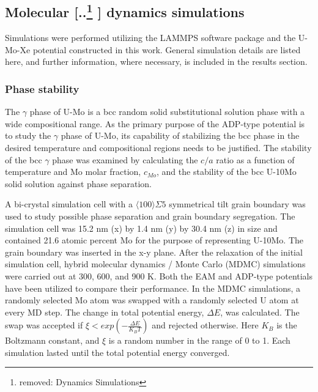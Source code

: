 \documentclass[review]{elsarticle}
\providecommand{\DIFaddtex}[1]{{\protect\color{blue} \sf #1}} %
\providecommand{\DIFdeltex}[1]{{\protect\color{red} [..\footnote{removed: #1} ]}} %
\providecommand{\DIFaddbegin}{} %
\providecommand{\DIFaddend}{} %
\providecommand{\DIFdelbegin}{} %
\providecommand{\DIFdelend}{} %
\providecommand{\DIFadd}[1]{\texorpdfstring{\DIFaddtex{#1}}{#1}} %
\providecommand{\DIFdel}[1]{\texorpdfstring{\DIFdeltex{#1}}{}} %
\newcommand{\DIFscaledelfig}{0.5}
\newlength{\DIFdelgraphicswidth} %
\newlength{\DIFdelgraphicsheight} %
\newcommand{\DIFaddincludegraphics}[2][]{{\color{blue}\fbox{\DIFOincludegraphics[#1]{#2}}}} %
\newcommand{\DIFdelincludegraphics}[2][]{%
\sbox{\DIFdelgraphicsbox}{\DIFOincludegraphics[#1]{#2}}%
\settoboxwidth{\DIFdelgraphicswidth}{\DIFdelgraphicsbox} %
\settoboxtotalheight{\DIFdelgraphicsheight}{\DIFdelgraphicsbox} %
\scalebox{\DIFscaledelfig}{%
\parbox[b]{\DIFdelgraphicswidth}{\usebox{\DIFdelgraphicsbox}\\[-\baselineskip] \rule{\DIFdelgraphicswidth}{0em}}\llap{\resizebox{\DIFdelgraphicswidth}{\DIFdelgraphicsheight}{%
\setlength{\unitlength}{\DIFdelgraphicswidth}%
\begin{picture}(1,1)%
\thicklines\linethickness{2pt} %
{\color[rgb]{1,0,0}\put(0,0){\framebox(1,1){}}}%
{\color[rgb]{1,0,0}\put(0,0){\line( 1,1){1}}}%
{\color[rgb]{1,0,0}\put(0,1){\line(1,-1){1}}}%
\end{picture}%
}\hspace*{3pt}}} %
} %
\DeclareRobustCommand{\DIFaddbegin}{\DIFOaddbegin \let\includegraphics\DIFaddincludegraphics} %
\DeclareRobustCommand{\DIFaddend}{\DIFOaddend \let\includegraphics\DIFOincludegraphics} %
\DeclareRobustCommand{\DIFdelbegin}{\DIFOdelbegin \let\includegraphics\DIFdelincludegraphics} %
\DeclareRobustCommand{\DIFdelend}{\DIFOaddend \let\includegraphics\DIFOincludegraphics} %
\begin{document}
\subsection{Molecular \DIFdelbegin \DIFdel{Dynamics Simulations}\DIFdelend \DIFaddbegin \DIFadd{dynamics simulations}\DIFaddend }

Simulations were performed utilizing the LAMMPS \cite{plimpton1995} software package and the U-Mo-Xe potential constructed in this work. General simulation details are listed here, and further information, where necessary, is included in the results section. 

\subsubsection{Phase stability}
The \DIFaddbegin \DIFadd{$\gamma$ phase of U-Mo is a bcc random solid substitutional solution phase with a wide compositional range. As the primary purpose of the ADP-type potential is to study the $\gamma$ phase of U-Mo, its capability of stabilizing the bcc phase in the desired temperature and compositional regions needs to be justified. The }\DIFaddend stability of the bcc $\gamma$ phase was examined by calculating the $c/a$ ratio as a function of temperature and Mo molar fraction, $c_{Mo}$, and the stability of the bcc U-10Mo solid solution against phase separation.

A bi-crystal simulation cell with a $\langle 100 \rangle \Sigma5$ symmetrical tilt grain boundary was used to study possible phase separation and grain boundary segregation. The simulation cell was 15.2 nm (x) by 1.4 nm (y) by 30.4 nm (z) in size and contained 21.6 atomic percent Mo for the purpose of representing U-10Mo. The grain boundary was inserted in the x-y plane. After the relaxation of the initial simulation cell, hybrid molecular dynamics / Monte Carlo (MDMC) simulations were carried out at 300, 600, and 900 K. Both the EAM and ADP-type potentials have been utilized to compare their performance. In the MDMC simulations, a randomly selected Mo atom was swapped with a randomly selected U atom at every MD step. The change in total potential energy, $\Delta E$, was calculated. The swap was accepted if $\xi<exp(-\frac{\Delta E}{K_BT})$ and rejected otherwise. Here $K_B$ is the Boltzmann constant, and $\xi$ is a random number in the range of 0 to 1. Each simulation lasted until the total potential energy converged. 
\end{document}
